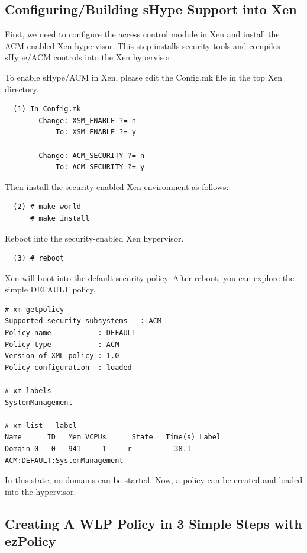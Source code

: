 \documentclass[11pt,twoside,final,openright]{report}
\begin{document}
\subsection{Configuring/Building sHype Support into Xen}
\label{subsection:acmexampleconfigure}
First, we need to configure the access control module in Xen and
install the ACM-enabled Xen hypervisor. This step installs security
tools and compiles sHype/ACM controls into the Xen hypervisor.

To enable sHype/ACM in Xen, please edit the Config.mk file in the top
Xen directory.

\begin{verbatim}
  (1) In Config.mk
        Change: XSM_ENABLE ?= n
            To: XSM_ENABLE ?= y

        Change: ACM_SECURITY ?= n
            To: ACM_SECURITY ?= y
\end{verbatim}

Then install the security-enabled Xen environment as follows:

\begin{verbatim}
  (2) # make world
      # make install
\end{verbatim}

Reboot into the security-enabled Xen hypervisor.

\begin{verbatim}
  (3) # reboot
\end{verbatim}

Xen will boot into the default security policy. After reboot,
you can explore the simple DEFAULT policy.
\begin{scriptsize}
\begin{verbatim}
# xm getpolicy
Supported security subsystems   : ACM
Policy name           : DEFAULT
Policy type           : ACM
Version of XML policy : 1.0
Policy configuration  : loaded

# xm labels
SystemManagement

# xm list --label
Name      ID   Mem VCPUs      State   Time(s) Label
Domain-0   0   941     1     r-----     38.1  ACM:DEFAULT:SystemManagement
\end{verbatim}
\end{scriptsize}

In this state, no domains can be started.
Now, a policy can be created and loaded into the hypervisor.

\subsection{Creating A WLP Policy in 3 Simple Steps with ezPolicy}
\label{subsection:acmexamplecreate}
\end{document}
